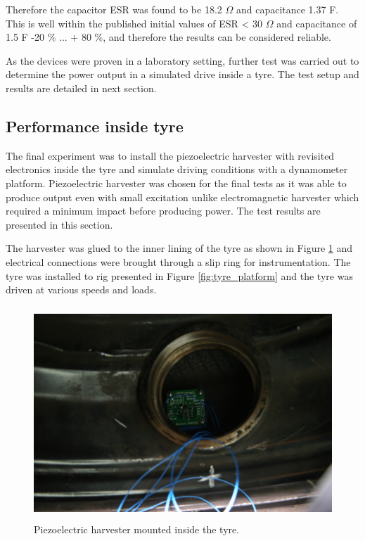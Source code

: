 Therefore the capacitor ESR was found to be 18.2 $\Omega$ and capacitance 1.37 F. This is well within the published \cite{panasonic_scap} initial values of ESR < 30 $\Omega$ and capacitance of 1.5 F -20 \% ... + 80 \%, and therefore the results can be considered reliable. 

As the devices were proven in a laboratory setting, further test was carried out to determine the power output in a simulated drive inside a tyre. The test setup and results are detailed in next section.

\subsection{Performance inside tyre}
The final experiment was to install the piezoelectric harvester with revisited electronics inside the tyre and simulate driving conditions with a dynamometer platform. Piezoelectric harvester was chosen for the final tests as it was able to produce output even with small excitation unlike electromagnetic harvester which required a minimum impact before producing power. The test results are presented in this section. 

The harvester was glued to the inner lining of the tyre as shown in Figure \ref{fig:harvester_potted} and electrical connections were brought through a slip ring for instrumentation. The tyre was installed to rig presented in Figure \ref{fig:tyre_platform} and the tyre was driven at various speeds and loads. 

\begin{figure}[htb]
\begin{center}
\includegraphics[height=8cm]{images/own_pic/tyre_fixture/piezo_bq_mount.jpg}
\end{center}
\caption{\label{fig:harvester_potted}Piezoelectric harvester mounted inside the tyre.}
\end{figure}

